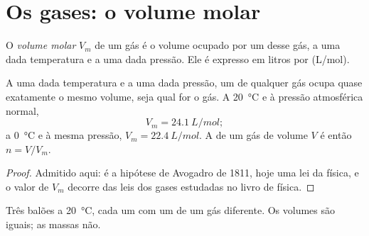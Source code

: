 \section{Os gases: o volume molar}

\begin{definition}\label{def:g10:the-mole:molar-volume}
O \emph{volume molar} $V_m$ de um gás é o volume
ocupado por um  desse gás, a uma dada temperatura e a uma dada
pressão. Ele é expresso em litros por  (\si{L/mol}).
\end{definition}

\begin{proposition}\label{prop:g10:the-mole:avogadro-law}
A uma dada temperatura e a uma dada pressão, um  de qualquer gás ocupa
quase exatamente o mesmo volume, seja qual for o gás. A
\qty{20}{\celsius} e à pressão atmosférica normal,
\[
  V_m = \qty{24.1}{L/mol};
\]
a \qty{0}{\celsius} e à mesma pressão, $V_m = \qty{22.4}{L/mol}$. A
 de um gás de volume $V$ é então $n = V / V_m$.
\end{proposition}

\begin{proof}
Admitido aqui: é a hipótese de Avogadro de 1811, hoje uma lei da física,
e o valor de $V_m$ decorre das leis dos gases estudadas no livro de
física.
\end{proof}

\begin{omfigure}

{\small Três balões a \qty{20}{\celsius}, cada um com um  de um gás
diferente. Os volumes são iguais; as massas não.}
\end{omfigure}


